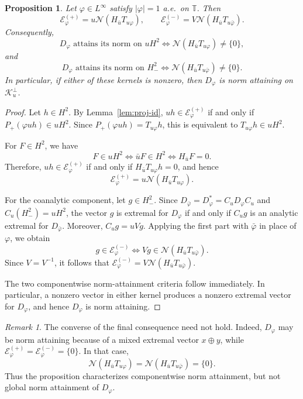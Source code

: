 \documentclass[12pt]{amsart}
\newtheorem{proposition}[theorem]{Proposition}
\theoremstyle{definition}
\theoremstyle{remark}
\newtheorem{remark}[theorem]{Remark}
\def \T{\mathbb{T}}
\newcommand{\cle}{\mathcal{E}}
\newcommand{\cln}{\mathcal{N}}
\newcommand{\clk}{\mathcal{K}}
\newcommand{\vp}{\varphi}
\numberwithin{equation}{section}
\begin{document}
\begin{proposition}\label{prop:HT-kernel-componentwise}
Let $\vp\in L^\infty$ satisfy $|\vp|=1$ a.e.\ on $\T$. Then
\[
\cle_\vp^{(+)}=u\cln\left(H_{\bar{u}}T_{u\vp}\right),\qquad
\cle_\vp^{(-)}=V\cln\left(H_{\bar{u}}T_{u\bar{\vp}}\right).
\]
Consequently,
\[
D_\vp \text{ attains its norm on }uH^2\iff \cln\left(H_{\bar{u}}T_{u\vp}\right)\neq\{0\},
\]
and
\[
D_\vp \text{ attains its norm on }H^2_{-}\iff
\cln\left(H_{\bar{u}}T_{u\bar{\vp}}\right)\neq\{0\}.
\]
In particular, if either of these kernels is nonzero, then $D_\vp$ is norm attaining on $\clk_u^\perp$.
\end{proposition}

\begin{proof}
Let $h\in H^2$. By Lemma~\ref{lem:proj-id}, $uh\in\cle_\vp^{(+)}$ if and only if $P_{+}(\vp uh)\in uH^2$. Since $P_{+}(\vp uh)=T_{u\vp}h$, this is equivalent to $T_{u\vp}h\in uH^2$.
	
For $F\in H^2$, we have
\[
F\in uH^2 \iff \bar{u}F\in H^2 \iff H_{\bar{u}}F=0.
\]
Therefore, $uh\in\cle_\vp^{(+)}$ if and only if $H_{\bar{u}}T_{u\vp}h=0$, and hence
\[
\cle_\vp^{(+)}=u\cln\left(H_{\bar{u}}T_{u\vp}\right).
	\]
	
For the coanalytic component, let $g\in H^2_{-}$. Since $D_{\bar{\vp}}=D_\vp^*=C_uD_\vp C_u$ and $C_u(H^2_{-})=uH^2$, the vector $g$ is extremal for $D_\vp$ if and only if $C_ug$ is an analytic extremal for $D_{\bar{\vp}}$. Moreover, $C_ug=uVg$. Applying the first part with $\bar{\vp}$ in place of $\vp$, we obtain
\[
g\in\cle_\vp^{(-)}\iff Vg\in\cln\left(H_{\bar{u}}T_{u\bar{\vp}}\right).
\]
Since $V=V^{-1}$, it follows that $\cle_\vp^{(-)} =V\cln\left(H_{\bar{u}}T_{u\bar{\vp}}\right)$.
	
The two componentwise norm-attainment criteria follow immediately.
In particular, a nonzero vector in either kernel produces a nonzero
extremal vector for $D_\vp$, and hence $D_\vp$ is norm attaining.
\end{proof}

\begin{remark}
The converse of the final consequence need not hold. Indeed, $D_\vp$ may be norm attaining because of a mixed extremal vector $x\oplus y$, while $\cle_\vp^{(+)}=\cle_\vp^{(-)}=\{0\}$. In that case,
\[
\cln\left(H_{\bar{u}}T_{u\vp}\right)=\cln \left(H_{\bar{u}}T_{u\bar{\vp}}\right)=\{0\}.
\]
Thus the proposition characterizes componentwise norm attainment, but not global norm attainment of $D_\vp$.
\end{remark}
\end{document}

